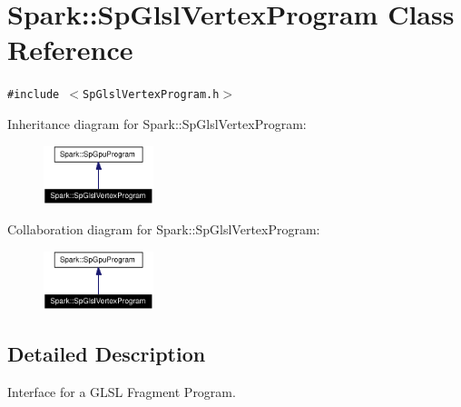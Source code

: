 \section{Spark::Sp\-Glsl\-Vertex\-Program Class Reference}
\label{classSpark_1_1SpGlslVertexProgram}
{\tt \#include $<$Sp\-Glsl\-Vertex\-Program.h$>$}

Inheritance diagram for Spark::Sp\-Glsl\-Vertex\-Program:\begin{figure}[H]
\begin{center}
\leavevmode
\includegraphics[width=91pt]{classSpark_1_1SpGlslVertexProgram__inherit__graph}
\end{center}
\end{figure}
Collaboration diagram for Spark::Sp\-Glsl\-Vertex\-Program:\begin{figure}[H]
\begin{center}
\leavevmode
\includegraphics[width=91pt]{classSpark_1_1SpGlslVertexProgram__coll__graph}
\end{center}
\end{figure}


\subsection{Detailed Description}
Interface for a GLSL Fragment Program. 

